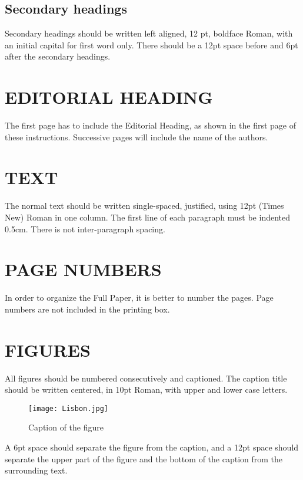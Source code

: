 \documentclass{wccm2024}
\begin{document}
\subsection {Secondary headings}

Secondary headings should be written left aligned, 12 pt, boldface
Roman, with an initial capital for first word only. There should
be a 12pt space before and 6pt after the secondary headings.

\section{EDITORIAL HEADING}

The first page has to include the Editorial Heading, as shown in
the first page of these instructions. Successive pages will
include the name of the authors.

\section{TEXT}

The normal text should be written single-spaced, justified, using
12pt (Times New) Roman in one column. The first line of each
paragraph must be indented 0.5cm. There is not inter-paragraph
spacing.

\section{PAGE NUMBERS}

In order to organize the Full Paper, it is better to number
the pages. Page numbers are not included in the printing box.

\section{FIGURES}

All figures should be numbered consecutively and captioned. The
caption title should be written centered, in 10pt Roman, with
upper and lower case letters.

\begin{figure}[t]
\centering
\texttt{[image: Lisbon.jpg]}
\caption{Caption of the figure}
\end{figure}

A 6pt space should separate the figure from the caption, and a
12pt space should separate the upper part of the figure and the
bottom of the caption from the surrounding text.
\end{document}
